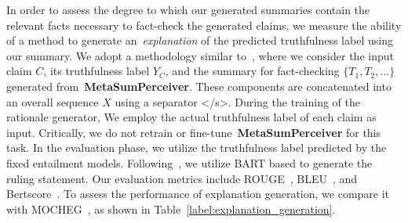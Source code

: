 \begin{table}[th]\Large
\centering
\caption{Performace of explanation generation. Our system outperforms MOCHEG on equivalent settings. Gold Evidence denotes ground truth text and image evidence while System Evidence means automatically retrieved text and image evidence. Gold Truthfulness denotes ground truth truthfulness label while System Truthfulness means the predicted truthfulness label.}
\label{label:explanation_generation}
\end{table}

In order to assess the degree to which our generated summaries contain the relevant facts necessary to fact-check the generated claims, we measure the ability of a method to generate an~\textit{explanation} of the predicted truthfulness label using our summary. We adopt a methodology similar to~\citet{Yao_2023}, where we consider the input claim $C$, its truthfulness label $Y_C$, and the summary for fact-checking $\{T_1, T_2, ...\}$ generated from~\textbf{MetaSumPerceiver}.  These components are concatenated into an overall sequence $X$ using a separator </s>. During the training of the rationale generator, We employ the actual truthfulness label of each claim as input. Critically, we do not retrain or fine-tune~\textbf{MetaSumPerceiver} for this task. In the evaluation phase, we utilize the truthfulness label predicted by the fixed entailment models. Following~\citet{Yao_2023}, we utilize BART based to generate the ruling statement. Our evaluation metrics include ROUGE~\cite{lin-2004-rouge}, BLEU~\cite{10.3115/1073083.1073135}, and Bertscore~\cite{zhang2020bertscore}. To assess the performance of explanation generation, we compare it with MOCHEG~\cite{Yao_2023}, as shown in Table~\ref{label:explanation_generation}.


